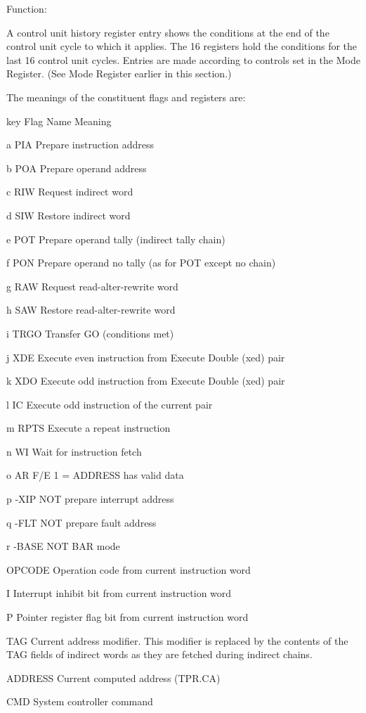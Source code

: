 Function:

A control unit history register entry shows the conditions at the end of the
control unit cycle to which it applies. The 16 registers hold the conditions
for the last 16 control unit cycles.  Entries are made according to controls
set in the Mode Register. (See Mode Register earlier in this section.)

The meanings of the constituent flags and registers are:

key Flag Name Meaning

a PIA Prepare instruction address

b POA Prepare operand address

c RIW Request indirect word

d SIW Restore indirect word

e POT Prepare operand tally (indirect tally chain)

f PON Prepare operand no tally (as for POT except no chain)

g RAW Request read-alter-rewrite word

h SAW Restore read-alter-rewrite word

i TRGO Transfer GO (conditions met)

j XDE Execute even instruction from Execute Double (xed) pair

k XDO Execute odd instruction from Execute Double (xed) pair

l IC Execute odd instruction of the current pair

m RPTS Execute a repeat instruction

n WI Wait for instruction fetch

o AR F/E 1 = ADDRESS has valid data

p -XIP NOT prepare interrupt address

q -FLT NOT prepare fault address

r -BASE NOT BAR mode

OPCODE Operation code from current instruction word

I Interrupt inhibit bit from current instruction word

P Pointer register flag bit from current instruction word

TAG Current address modifier. This modifier is replaced by the contents of the
TAG fields of indirect words as they are fetched during indirect chains.

ADDRESS Current computed address (TPR.CA)

CMD System controller command

